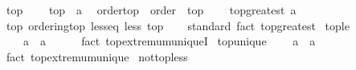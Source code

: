 \begin{isabellebody}
\isamarkupfalse%
\isanewline
\isanewline
{}\isamarkupfalse%
\ top\ {\isacharequal}{\kern0pt}\isanewline
\ \ \ top\ {\isacharcolon}{\kern0pt}{\isacharcolon}{\kern0pt}\ {\isacharprime}{\kern0pt}a\ {\isacharparenleft}{\kern0pt}{\isachardoublequoteopen}{\isasymtop}{\isachardoublequoteclose}{\isacharparenright}{\kern0pt}\isanewline
\isanewline
{}\isamarkupfalse%
\ order{\isacharunderscore}{\kern0pt}top\ {\isacharequal}{\kern0pt}\ order\ {\isacharplus}{\kern0pt}\ top\ {\isacharplus}{\kern0pt}\isanewline
\ \ \ top{\isacharunderscore}{\kern0pt}greatest{\isacharcolon}{\kern0pt}\ {\isachardoublequoteopen}a\ {\isasymle}\ {\isasymtop}{\isachardoublequoteclose}\isanewline
{}\isanewline
\isanewline
{}\isamarkupfalse%
\ top{\isacharcolon}{\kern0pt}\ ordering{\isacharunderscore}{\kern0pt}top\ less{\isacharunderscore}{\kern0pt}eq\ less\ top\isanewline
%
\isadelimproof
\ \ %
\endisadelimproof
%
\isatagproof
{}\isamarkupfalse%
\ standard\ {\isacharparenleft}{\kern0pt}fact\ top{\isacharunderscore}{\kern0pt}greatest{\isacharparenright}{\kern0pt}%
\endisatagproof
{\isafoldproof}%
%
\isadelimproof
\isanewline
%
\endisadelimproof
\isanewline
{}\isamarkupfalse%
\ top{\isacharunderscore}{\kern0pt}le{\isacharcolon}{\kern0pt}\isanewline
\ \ {\isachardoublequoteopen}{\isasymtop}\ {\isasymle}\ a\ {\isasymLongrightarrow}\ a\ {\isacharequal}{\kern0pt}\ {\isasymtop}{\isachardoublequoteclose}\isanewline
%
\isadelimproof
\ \ %
\endisadelimproof
%
\isatagproof
{}\isamarkupfalse%
\ {\isacharparenleft}{\kern0pt}fact\ top{\isachardot}{\kern0pt}extremum{\isacharunderscore}{\kern0pt}uniqueI{\isacharparenright}{\kern0pt}%
\endisatagproof
{\isafoldproof}%
%
\isadelimproof
\isanewline
%
\endisadelimproof
\isanewline
{}\isamarkupfalse%
\ top{\isacharunderscore}{\kern0pt}unique{\isacharcolon}{\kern0pt}\isanewline
\ \ {\isachardoublequoteopen}{\isasymtop}\ {\isasymle}\ a\ {\isasymlongleftrightarrow}\ a\ {\isacharequal}{\kern0pt}\ {\isasymtop}{\isachardoublequoteclose}\isanewline
%
\isadelimproof
\ \ %
\endisadelimproof
%
\isatagproof
{}\isamarkupfalse%
\ {\isacharparenleft}{\kern0pt}fact\ top{\isachardot}{\kern0pt}extremum{\isacharunderscore}{\kern0pt}unique{\isacharparenright}{\kern0pt}%
\endisatagproof
{\isafoldproof}%
%
\isadelimproof
\isanewline
%
\endisadelimproof
\isanewline
{}\isamarkupfalse%
\ not{\isacharunderscore}{\kern0pt}top{\isacharunderscore}{\kern0pt}less{\isacharcolon}{\kern0pt}\isanewline

\end{isabellebody}
